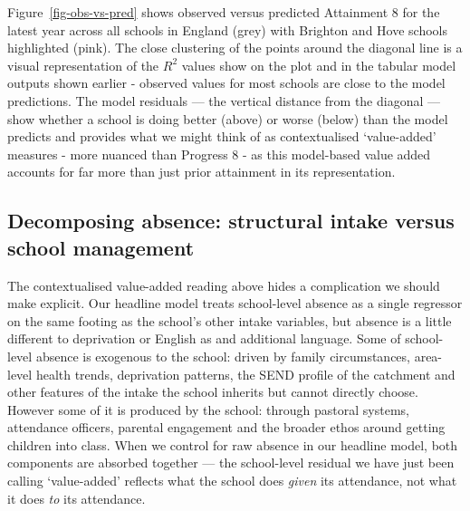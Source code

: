\documentclass[
  12pt,
  titlepage]{article}
\begin{document}
Figure~\ref{fig-obs-vs-pred} shows observed versus predicted Attainment
8 for the latest year across all schools in England (grey) with Brighton
and Hove schools highlighted (pink). The close clustering of the points
around the diagonal line is a visual representation of the \(R^2\)
values show on the plot and in the tabular model outputs shown earlier -
observed values for most schools are close to the model predictions. The
model residuals --- the vertical distance from the diagonal --- show
whether a school is doing better (above) or worse (below) than the model
predicts and provides what we might think of as contextualised
`value-added' measures - more nuanced than Progress 8 - as this
model-based value added accounts for far more than just prior attainment
in its representation.

\subsection{Decomposing absence: structural intake versus school
management}\label{decomposing-absence-structural-intake-versus-school-management}

The contextualised value-added reading above hides a complication we
should make explicit. Our headline model treats school-level absence as
a single regressor on the same footing as the school's other intake
variables, but absence is a little different to deprivation or English
as and additional language. Some of school-level absence is exogenous to
the school: driven by family circumstances, area-level health trends,
deprivation patterns, the SEND profile of the catchment and other
features of the intake the school inherits but cannot directly choose.
However some of it is produced by the school: through pastoral systems,
attendance officers, parental engagement and the broader ethos around
getting children into class. When we control for raw absence in our
headline model, both components are absorbed together --- the
school-level residual we have just been calling `value-added' reflects
what the school does \emph{given} its attendance, not what it does
\emph{to} its attendance.
\end{document}
